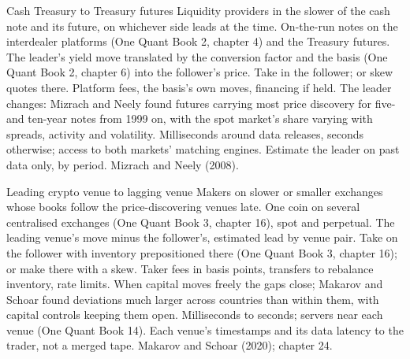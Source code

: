 \begin{strategyfile}{Cash Treasury to Treasury futures}\label{strat:hf:lead-lag-and-cross-venue-trading:treasury}
 Liquidity providers in the slower of the cash note and its future, on whichever side leads at the time.
 On-the-run notes on the interdealer platforms (One Quant Book 2, chapter 4) and the Treasury futures.
 The leader's yield move translated by the conversion factor and the basis (One Quant Book 2, chapter 6) into the follower's price.
 Take in the follower; or skew quotes there.
 Platform fees, the basis's own moves, financing if held.
 The leader changes: Mizrach and Neely found futures carrying most price discovery for five- and ten-year notes from 1999 on,
with the spot market's share varying with spreads, activity and volatility.
 Milliseconds around data releases, seconds otherwise; access to both markets' matching engines.
 Estimate the leader on past data only, by period.
 Mizrach and Neely (2008).
\end{strategyfile}

\begin{strategyfile}{Leading crypto venue to lagging venue}\label{strat:hf:lead-lag-and-cross-venue-trading:crypto}
 Makers on slower or smaller exchanges whose books follow the price-discovering venues late.
 One coin on several centralised exchanges (One Quant Book 3, chapter 16), spot and perpetual.
 The leading venue's move minus the follower's, estimated lead by venue pair.
 Take on the follower with inventory prepositioned there (One Quant Book 3, chapter 16); or make there with a skew.
 Taker fees in basis points, transfers to rebalance inventory, rate limits.
 When capital moves freely the gaps close; Makarov and Schoar found deviations much larger across countries than within them, with
capital controls keeping them open.
 Milliseconds to seconds; servers near each venue (One Quant Book 14).
 Each venue's timestamps and its data latency to the trader, not a merged tape.
 Makarov and Schoar (2020); chapter 24.
\end{strategyfile}

